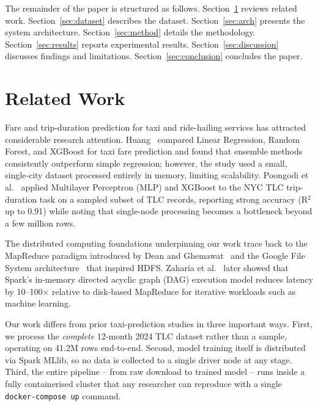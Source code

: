 \documentclass[conference]{IEEEtran}
\begin{document}
The remainder of the paper is structured as follows.
Section~\ref{sec:related} reviews related work.
Section~\ref{sec:dataset} describes the dataset.
Section~\ref{sec:arch} presents the system architecture.
Section~\ref{sec:method} details the methodology.
Section~\ref{sec:results} reports experimental results.
Section~\ref{sec:discussion} discusses findings and limitations.
Section~\ref{sec:conclusion} concludes the paper.

\section{Related Work}
\label{sec:related}

Fare and trip-duration prediction for taxi and ride-hailing services
has attracted considerable research attention. Huang~\cite{huang2023taxi}
compared Linear Regression, Random Forest, and XGBoost for taxi fare
prediction and found that ensemble methods consistently outperform
simple regression; however, the study used a small, single-city
dataset processed entirely in memory, limiting scalability.
Poongodi et al.~\cite{poongodi2022nyc} applied Multilayer Perceptron
(MLP) and XGBoost to the NYC TLC trip-duration task on a sampled
subset of TLC records, reporting strong accuracy (R$^{2}$ up to
0.91) while noting that single-node processing becomes a bottleneck
beyond a few million rows.

The distributed computing foundations underpinning our work trace
back to the MapReduce paradigm introduced by Dean and
Ghemawat~\cite{dean2008mapreduce} and the Google File System
architecture~\cite{ghemawat2003gfs} that inspired HDFS. Zaharia et
al.~\cite{zaharia2016apache} later showed that Spark's in-memory
directed acyclic graph (DAG) execution model reduces latency by
10--100$\times$ relative to disk-based MapReduce for iterative
workloads such as machine learning.

Our work differs from prior taxi-prediction studies in three
important ways. First, we process the \emph{complete} 12-month 2024
TLC dataset rather than a sample, operating on 41.2M rows
end-to-end. Second, model training itself is distributed via Spark
MLlib, so no data is collected to a single driver node at any stage.
Third, the entire pipeline -- from raw download to trained model --
runs inside a fully containerised cluster that any researcher can
reproduce with a single \texttt{docker-compose up} command.

\end{document}
